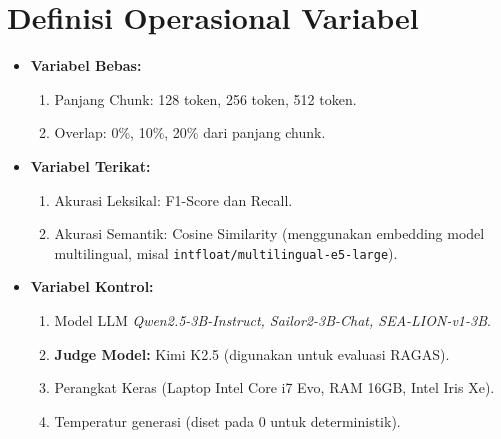 \section{Definisi Operasional Variabel}
\begin{itemize}
  \item \textbf{Variabel Bebas:}
  \begin{enumerate}
    \item Panjang Chunk: 128 token, 256 token, 512 token.
    \item Overlap: 0\%, 10\%, 20\% dari panjang chunk.
  \end{enumerate}

  \item \textbf{Variabel Terikat:}
  \begin{enumerate}
    \item Akurasi Leksikal: F1-Score dan Recall.
    \item Akurasi Semantik: Cosine Similarity (menggunakan embedding model multilingual, misal \texttt{intfloat/multilingual-e5-large}).
  \end{enumerate}

  \item \textbf{Variabel Kontrol:}
  \begin{enumerate}
    \item Model LLM \textit{Qwen2.5-3B-Instruct, Sailor2-3B-Chat, SEA-LION-v1-3B}.
    \item \textbf{Judge Model:} Kimi K2.5 (digunakan untuk evaluasi RAGAS).
    \item Perangkat Keras (Laptop Intel Core i7 Evo, RAM 16GB, Intel Iris Xe).
    \item Temperatur generasi (diset pada 0 untuk deterministik).
  \end{enumerate}
\end{itemize}



